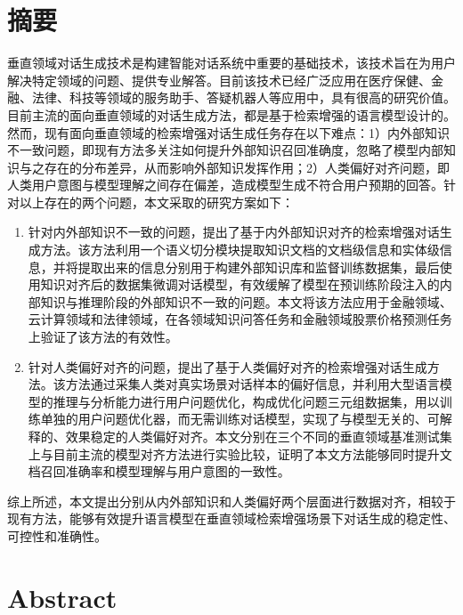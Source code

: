 \chapter{摘\texorpdfstring{\quad}{}要}

垂直领域对话生成技术是构建智能对话系统中重要的基础技术，该技术旨在为用户解决特定领域的问题、提供专业解答。目前该技术已经广泛应用在医疗保健、金融、法律、科技等领域的服务助手、答疑机器人等应用中，具有很高的研究价值。目前主流的面向垂直领域的对话生成方法，都是基于检索增强的语言模型设计的。然而，现有面向垂直领域的检索增强对话生成任务存在以下难点：1）内外部知识不一致问题，即现有方法多关注如何提升外部知识召回准确度，忽略了模型内部知识与之存在的分布差异，从而影响外部知识发挥作用；2）人类偏好对齐问题，即人类用户意图与模型理解之间存在偏差，造成模型生成不符合用户预期的回答。针对以上存在的两个问题，本文采取的研究方案如下：

\begin{enumerate}[topsep = 0 pt, itemsep= 0 pt, parsep=0pt, partopsep=0pt, leftmargin=0pt, itemindent=44pt, labelsep=6pt, listparindent=24pt, label=\arabic*)]
	\item 针对内外部知识不一致的问题，提出了基于内外部知识对齐的检索增强对话生成方法。该方法利用一个语义切分模块提取知识文档的文档级信息和实体级信息，并将提取出来的信息分别用于构建外部知识库和监督训练数据集，最后使用知识对齐后的数据集微调对话模型，有效缓解了模型在预训练阶段注入的内部知识与推理阶段的外部知识不一致的问题。本文将该方法应用于金融领域、云计算领域和法律领域，在各领域知识问答任务和金融领域股票价格预测任务上验证了该方法的有效性。

	\item 针对人类偏好对齐的问题，提出了基于人类偏好对齐的检索增强对话生成方法。该方法通过采集人类对真实场景对话样本的偏好信息，并利用大型语言模型的推理与分析能力进行用户问题优化，构成优化问题三元组数据集，用以训练单独的用户问题优化器，而无需训练对话模型，实现了与模型无关的、可解释的、效果稳定的人类偏好对齐。本文分别在三个不同的垂直领域基准测试集上与目前主流的模型对齐方法进行实验比较，证明了本文方法能够同时提升文档召回准确率和模型理解与用户意图的一致性。
\end{enumerate}

综上所述，本文提出分别从内外部知识和人类偏好两个层面进行数据对齐，相较于现有方法，能够有效提升语言模型在垂直领域检索增强场景下对话生成的稳定性、可控性和准确性。


\chapter{Abstract}

